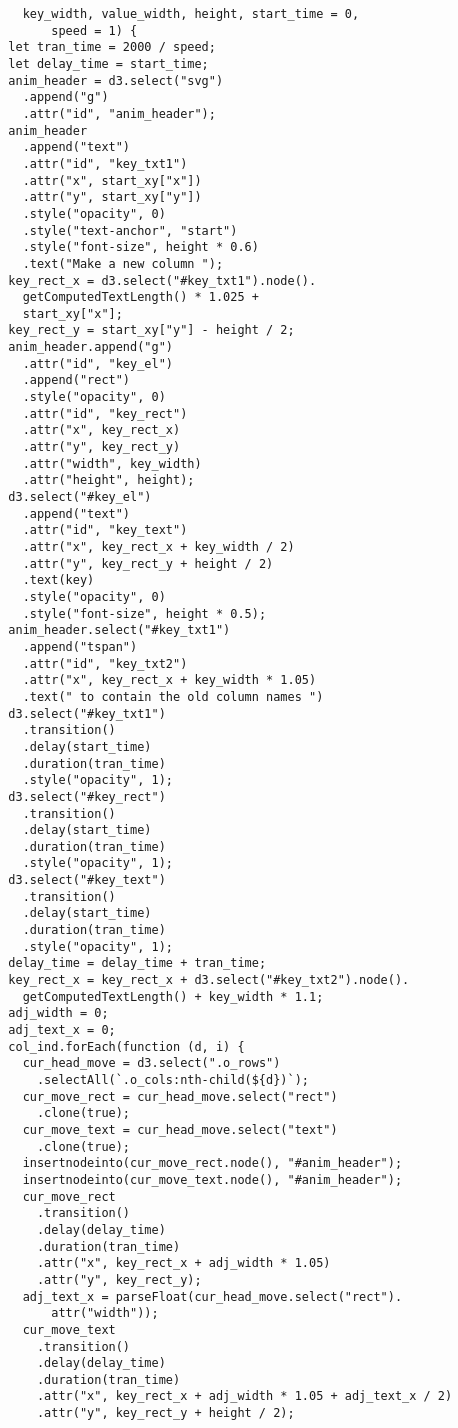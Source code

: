 \begin{lstlisting}
    key_width, value_width, height, start_time = 0, 
        speed = 1) {
  let tran_time = 2000 / speed;
  let delay_time = start_time;
  anim_header = d3.select("svg")
    .append("g")
    .attr("id", "anim_header");
  anim_header
    .append("text")
    .attr("id", "key_txt1")
    .attr("x", start_xy["x"])
    .attr("y", start_xy["y"])
    .style("opacity", 0)
    .style("text-anchor", "start")
    .style("font-size", height * 0.6)
    .text("Make a new column ");
  key_rect_x = d3.select("#key_txt1").node().
    getComputedTextLength() * 1.025 +
    start_xy["x"];
  key_rect_y = start_xy["y"] - height / 2;
  anim_header.append("g")
    .attr("id", "key_el")
    .append("rect")
    .style("opacity", 0)
    .attr("id", "key_rect")
    .attr("x", key_rect_x)
    .attr("y", key_rect_y)
    .attr("width", key_width)
    .attr("height", height);
  d3.select("#key_el")
    .append("text")
    .attr("id", "key_text")
    .attr("x", key_rect_x + key_width / 2)
    .attr("y", key_rect_y + height / 2)
    .text(key)
    .style("opacity", 0)
    .style("font-size", height * 0.5);
  anim_header.select("#key_txt1")
    .append("tspan")
    .attr("id", "key_txt2")
    .attr("x", key_rect_x + key_width * 1.05)
    .text(" to contain the old column names ")
  d3.select("#key_txt1")
    .transition()
    .delay(start_time)
    .duration(tran_time)
    .style("opacity", 1);
  d3.select("#key_rect")
    .transition()
    .delay(start_time)
    .duration(tran_time)
    .style("opacity", 1);
  d3.select("#key_text")
    .transition()
    .delay(start_time)
    .duration(tran_time)
    .style("opacity", 1);
  delay_time = delay_time + tran_time;
  key_rect_x = key_rect_x + d3.select("#key_txt2").node().
    getComputedTextLength() + key_width * 1.1;
  adj_width = 0;
  adj_text_x = 0;
  col_ind.forEach(function (d, i) {
    cur_head_move = d3.select(".o_rows")
      .selectAll(`.o_cols:nth-child(${d})`);
    cur_move_rect = cur_head_move.select("rect")
      .clone(true);
    cur_move_text = cur_head_move.select("text")
      .clone(true);
    insertnodeinto(cur_move_rect.node(), "#anim_header");
    insertnodeinto(cur_move_text.node(), "#anim_header");
    cur_move_rect
      .transition()
      .delay(delay_time)
      .duration(tran_time)
      .attr("x", key_rect_x + adj_width * 1.05)
      .attr("y", key_rect_y);
    adj_text_x = parseFloat(cur_head_move.select("rect").
        attr("width"));
    cur_move_text
      .transition()
      .delay(delay_time)
      .duration(tran_time)
      .attr("x", key_rect_x + adj_width * 1.05 + adj_text_x / 2)
      .attr("y", key_rect_y + height / 2);

\end{lstlisting}
